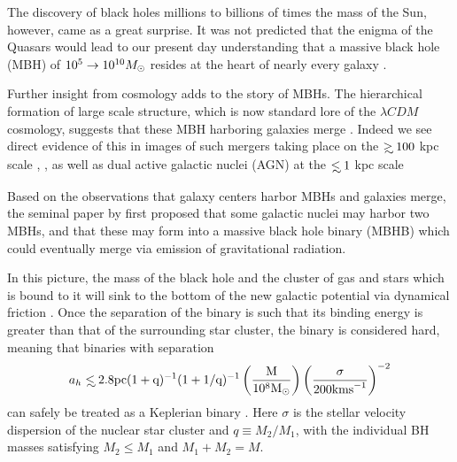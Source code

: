 The discovery of black holes millions to billions of times the mass of the
Sun, however, came as a great surprise. It was not predicted that the enigma
of the Quasars \citep[\emph{e.g.}][]{Schmidt:1963, Salpeter:1964,
LyndenBell:1969} would lead to our present day understanding that a massive
black hole (MBH) of $10^5 \rightarrow 10^{10} {M_{\odot}}$ resides at the heart of
nearly every galaxy \citep{kr95, KormendyHo2013, ff05}.

Further insight from cosmology adds to the story of MBHs. The hierarchical
formation of large scale structure, which is now standard lore of the $\lambda
CDM$ cosmology, suggests that these MBH harboring galaxies merge \citep{HK2002}.
Indeed we see direct evidence of this in images of such mergers taking place
on the $\gsim 100$ kpc scale \citep{Comerford:2013}, \citep[see also][and
references therein]{Dotti:2012:rev}, as well as dual active galactic nuclei
(AGN) at the $\lsim 1$ kpc scale \citep{Komossa:2003, Fabbiano:2011,Rodriguez:2006, BurkeSpolaor:2011, ColpiDotti:2011:rev, Gitti:2013, Woo:subKpcBin:2014,
AndradeSantos:2016}


Based on the observations that galaxy centers harbor MBHs and galaxies merge,
the seminal paper by \cite{Begel:Blan:Rees:1980} first proposed that some
galactic nuclei may harbor two MBHs, and that these may form into a massive
black hole binary (MBHB) which could eventually merge via emission of
gravitational radiation.

In this picture, the mass of the black hole and the cluster of gas and stars
which is bound to it will sink to the bottom of the new galactic potential via
dynamical friction \citep{Begel:Blan:Rees:1980, Chandrasekhar:1943}. Once the
separation of the binary is such that its binding energy is
greater than that of the surrounding star cluster, the binary is considered
hard, meaning that binaries with separation
\begin{equation}
a_h \lsim 2.8 \rm{pc} (1+q)^{-1} (1+1/q)^{-1}  \left( \frac{M}{10^8 \Msun} \right)  
\left( \frac{\sigma}{200 \rm{km s}^{-1}} \right)^{-2}
\end{equation}
can safely be treated as a Keplerian binary
\citep[\emph{e.g.}][]{MerrittMilos:2005:LRR}. Here $\sigma$ is the stellar
velocity dispersion of the nuclear star cluster and $q\equiv M_2/M_1$, with
the individual BH masses satisfying $M_2 \leq M_1$ and $M_1+M_2=M$.

